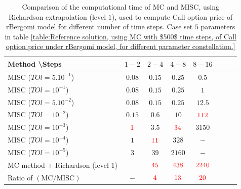 \documentclass[11pt]{article}
\begin{document}
\begin{table}[h!]
	\centering
	\begin{tabular}{l*{6}{c}r}
		Method \textbackslash  Steps            & $1-2$ & $2-4$ & $4-8$ & $8-16$ &   \\
		\hline
		MISC ($TOl=5.10^{-1}$)   & $0.08$ & $0.15$ & $0.25$ & $0.5$  \\
		MISC ($TOl=10^{-1}$)   &$0.08$ &  $0.15$ & $0.25$ & $1$  \\
		MISC ($TOl=5.10^{-2}$)  &$0.08$  &  $0.15$ & $0.25$ & $12.5$  \\
		MISC ($TOl=10^{-2}$)   & $0.15$ & $0.6$ & $10$ & ${\color{red}112}$  \\
		MISC ($TOl=10^{-3}$)  & ${\color{red}1}$ & $3.5$ & ${\color{red}34}$ & $3150$ \\
		MISC ($TOl=10^{-4}$)  & $1$ & ${\color{red}11}$ & $328$ & $-$  \\
		MISC ($TOl=10^{-5}$)  & $3$ & $39$ & $2160$ & $-$  \\
		\hline	
			MC method + Richardson (level 1)  &$-$ & ${\color{red}45}$  & ${\color{red}438}$  & ${\color{red}2240}$ \\
			
			\hline
				Ratio of $\left(\text{MC}/ \text{MISC} \right)$  &$-$ & ${\color{red}4}$  & ${\color{red}13}$  & ${\color{red}20}$ \\
		\hline
	\end{tabular}
	\caption{Comparison of the computational time of  MC and MISC, using Richardson extrapolation (level $1$), used to compute Call option price of rBergomi model for different number of time steps. Case set $5$ parameters in table \ref{table:Reference solution, using MC with $500$ time steps, of Call option price under rBergomi model, for different parameter constellation.}}
	\label{Comparsion of the computational time of  MC and MISC, using Richardson extrapolation (level $1$), used to compute Call option price of rBergomi model for different number of time steps. Case set $5$ parameters}
\end{table}
\end{document}
